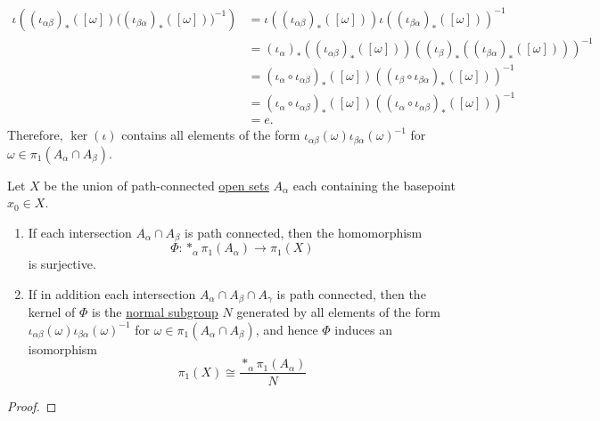 	\begin{align}
		\iota\left( (\iota_{\alpha\beta})_*([\omega]) \big((\iota_{\beta\alpha})_*([\omega])\big)^{-1} \right) & = \iota\left((\iota_{\alpha\beta})_*([\omega])\right)
			\iota\left((\iota_{\beta\alpha})_*([\omega])\right)^{-1} \\
		& = (\iota_\alpha)_*\left((\iota_{\alpha\beta})_*([\omega])\right)
			\left((\iota_\beta)_*\left((\iota_{\beta\alpha})_*([\omega])\right)\right)^{-1} \\
		& = (\iota_\alpha\circ\iota_{\alpha\beta})_*([\omega])
			\left((\iota_\beta\circ\iota_{\beta\alpha})_*([\omega])\right)^{-1} \\
		& = (\iota_\alpha\circ\iota_{\alpha\beta})_*([\omega])
			\left((\iota_\alpha\circ\iota_{\alpha\beta})_*([\omega])\right)^{-1} \\
		& = e.
	\end{align}
	Therefore, $\ker(\iota)$ contains all elements of the form $\iota_{\alpha \beta}(\omega) \iota_{\beta \alpha}(\omega)^{-1}$ for $\omega \in \pi_1 (A_\alpha \cap A_\beta)$. 


	\begin{theorem}
	  \label{thm:van-kampen-theorem}
	  Let $X$ be the union of path-connected \hyperref[pst-def:open-set]{open sets} $A_\alpha$ each containing the basepoint $x_0 \in X$. 
		\begin{enumerate}
		  \item If each intersection $A_\alpha \cap A_\beta$ is path connected, then the homomorphism 
				\begin{equation}
				  \Phi: \ast_\alpha \pi_1 (A_\alpha) \to \pi_1 (X) 
				\end{equation}
				is surjective. 

			\item If in addition each intersection $A_\alpha \cap A_\beta \cap A_\gamma$ is path connected, then the kernel of $\Phi$ is the \hyperref[alg-def:normal_subgroup]{normal subgroup} $N$ generated by all elements of the form $\iota_{\alpha \beta}(\omega) \iota_{\beta \alpha}(\omega)^{-1}$ for $\omega \in \pi_1 (A_\alpha \cap A_\beta)$, and hence $\Phi$ induces an isomorphism 
				\begin{equation}
					\pi_1 (X) \cong \frac{\ast_\alpha \pi_1 (A_\alpha)}{N}
				\end{equation}
		\end{enumerate}
	\end{theorem}
	\begin{proof}
	  
	\end{proof}

